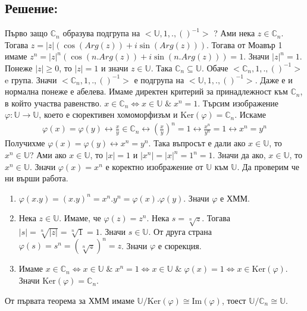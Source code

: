 \documentclass[12pt]{article}
\begin{document}
\subsection{Решение:}
Първо защо \(\mathbb{C}_n\) образува подгрупа на \(<\mathbb{U}, 1, . , ()^{-1}>\) ?
Ами нека \(z \in \mathbb{C}_n\). Тогава \(z = |z|\left(\cos\left(Arg(z)\right) + i\sin\left(Arg(z)\right)\right)\). Тогава от Моавър 1 имаме
\(z^n = |z|^n\left(\cos\left(n.Arg(z)\right) + i\sin\left(n.Arg(z)\right)\right) = 1\).
Значи \(|z|^n = 1\). Понеже \(|z| \geq 0\), то \(|z| = 1\) и значи \(z \in \mathbb{U}\).
Така \(\mathbb{C}_n \subseteq \mathbb{U}\).
Обаче \(<\mathbb{C}_n, 1, . , ()^{-1}>\) e група.
Значи \(<\mathbb{C}_n, 1, . , ()^{-1}>\) е подгрупа на \(<\mathbb{U}, 1, . , ()^{-1}>\).
Даже е и нормална понеже е абелева.
Имаме директен критерий за принадлежност към \(\mathbb{C}_n\), в който участва равенство.
\(x \in \mathbb{C}_n \iff x \in \mathbb{U} \; \& \; x^n = 1\).
Търсим изображение \(\varphi : \mathbb{U} \to \mathbb{U}\),
    което е сюрективен хомоморфизъм и \(\mathrm{Ker}(\varphi) = \mathbb{C}_n\).
Искаме \begin{align*}
        \varphi(x) = \varphi(y) \longleftrightarrow 
        \displaystyle\frac{x}{y} \in \mathbb{C}_n \longleftrightarrow 
        \left(\displaystyle\frac{x}{y}\right)^n = 1 \longleftrightarrow
        \displaystyle\frac{x^n}{y^n} = 1 \longleftrightarrow
        x^n = y^n
    \end{align*}
    Получихме \(\varphi(x) = \varphi(y) \longleftrightarrow x^n = y^n\).
    Така въпросът е дали ако \(x \in \mathbb{U}\), то \(x^n \in \mathbb{U}\)?
    Ами ако \(x \in \mathbb{U}\), то \(|x| = 1\) и \(|x^n| = |x|^n = 1^n = 1\).
    Значи да ако, \(x \in \mathbb{U}\), то \(x^n \in \mathbb{U}\).
    Значи \(\varphi(x) = x^n\) е коректно изображение от \(\mathbb{U}\) към \(\mathbb{U}\). Да проверим че ни върши работа.
    \begin{enumerate}
        \item \(\varphi(x.y) = (x.y)^n = x^n . y^n = \varphi(x) . \varphi(y)\). Значи \(\varphi\) е ХММ.
        \item Нека \(z \in \mathbb{U}\). Имаме, че \(\varphi(z) = z^n\).
        Нека \(s = \sqrt[n]{z}\). Тогава \(|s| = \sqrt[n]{|z|} = \sqrt[n]{1} = 1\).
        Значи \(s \in \mathbb{U}\).
        От друга страна \(\varphi(s) = s^n = (\sqrt[n]{z})^n = z\). Значи \(\varphi\) е сюрекция.
        \item Имаме \(x \in \mathbb{C}_n \iff x \in \mathbb{U} \; \& \; x^n = 1 \iff x \in \mathbb{U} \; \& \; \varphi(x) = 1 \iff x \in \mathrm{Ker}(\varphi)\).
        Значи \(\mathrm{Ker}(\varphi) = \mathbb{C}_n\).
    \end{enumerate}
    От първата теорема за ХММ имаме \(\mathbb{U} / \mathrm{Ker}(\varphi) \cong \mathrm{Im}(\varphi)\), тоест \(\mathbb{U} / \mathbb{C}_n \cong \mathbb{U}\).
\end{document}

